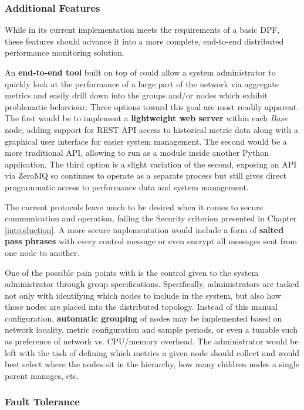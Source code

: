 \subsubsection{Additional Features}

While \dcamp in its current implementation meets the requirements of a basic DPF, these features should advance it into
a more complete, end-to-end distributed performance monitoring solution.

An \textbf{end-to-end tool} built on top of \dcamp could allow a system administrator to quickly look at the performance
of a large part of the network via aggregate metrics and easily drill down into the groups and/or nodes which exhibit
problematic behaviour. Three options toward this goal are most readily apparent. The first would be to implement a
\textbf{lightweight web server} within each \textit{Base} node, adding support for REST API access to historical metric
data along with a graphical user interface for easier \dcamp system management. The second would be a more traditional
API, allowing \dcamp to run as a module inside another Python application. The third option is a slight variation of the
second, exposing an API via ZeroMQ so \dcamp continues to operate as a separate process but still gives direct
programmatic access to performance data and system management.

The current \dcamp protocols leave much to be desired when it comes to secure communication and operation, failing the
Security criterion presented in Chapter \ref{introduction}. A more secure implementation would include a form of
\textbf{salted pass phrases} with every control message or even encrypt all messages sent from one node to another.

One of the possible pain points with \dcamp is the control given to the system administrator through group
specifications. Specifically, administrators are tasked not only with identifying which nodes to include in the system,
but also how those nodes are placed into the distributed topology. Instead of this manual configuration,
\textbf{automatic grouping} of nodes may be implemented based on network locality, metric configuration and sample
periods, or even a tunable such as preference of network vs. CPU/memory overhead. The administrator would be left with
the task of defining which metrics a given node should collect and \dcamp would best select where the nodes sit in the
hierarchy, how many children nodes a single parent manages, etc.

\subsubsection{Fault Tolerance}

